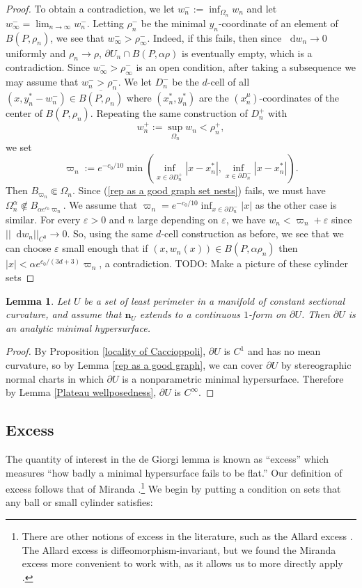 \documentclass[reqno,10pt]{amsart}
\newcommand*\dif{\mathop{}\!\mathrm{d}}
\newcommand{\normal}{\mathbf n}
\newtheorem{lemma}[theorem]{Lemma}
\theoremstyle{definition}
\numberwithin{equation}{section}
\begin{document}
\begin{proof}
To obtain a contradiction, we let $w_n^- := \inf_{\Omega_n} w_n$ and let $w_\infty^- = \lim_{n \to \infty} w_n^-$.
Letting $\rho^-_n$ be the minimal $y_n$-coordinate of an element of $B(P, \rho_n)$, we see that $w_\infty^- > \rho^-_\infty$.
Indeed, if this fails, then since $\dif w_n \to 0$ uniformly and $\rho_n \to \rho$, $\partial U_n \cap B(P, \alpha \rho)$ is eventually empty, which is a contradiction.
Since $w_\infty^- > \rho^-_\infty$ is an open condition, after taking a subsequence we may assume that $w_n^- > \rho_n^-$.
We let $D_n^-$ be the $d$-cell of all $(x, y_n^* - w_n^-) \in \overline{B(P, \rho_n)}$ where $(x_n^*, y_n^*)$ are the $(x^\mu_n)$-coordinates of the center of $B(P, \rho_n)$.
Repeating the same construction of $D_n^+$ with
$$w_n^+ := \sup_{\Omega_n} w_n < \rho_n^+,$$
we set
$$\varpi_n := e^{-c_0/10}\min\left(\inf_{x \in \partial D_n^+} |x - x_n^*|, \inf_{x \in \partial D_n^-} |x - x_n^*|\right).$$
Then $B_{\varpi_n} \Subset \Omega_n$.
Since (\ref{rep as a good graph set nests}) fails, we must have $\Omega^\alpha_n \not \Subset B_{\alpha e^{c_0} \varpi_n}$.
We assume that $\varpi_n = e^{-c_0/10} \inf_{x \in \partial D_n^-} |x|$ as the other case is similar.
For every $\varepsilon > 0$ and $n$ large depending on $\varepsilon$, we have $w_n < \varpi_n + \varepsilon$ since $||\dif w_n||_{C^0} \to 0$.
So, using the same $d$-cell construction as before, we see that we can choose $\varepsilon$ small enough that if $(x, w_n(x)) \in B(P, \alpha \rho_n)$ then $|x| < \alpha e^{c_0/(3d + 3)} \varpi_n$, a contradiction.
TODO: Make a picture of these cylinder sets
\end{proof}

\begin{lemma}\label{C1 implies smooth}
Let $U$ be a set of least perimeter in a manifold of constant sectional curvature, and assume that $\normal_U$ extends to a continuous $1$-form on $\partial U$.
Then $\partial U$ is an analytic minimal hypersurface.
\end{lemma}
\begin{proof}
By Proposition \ref{locality of Caccioppoli}, $\partial U$ is $C^1$ and has no mean curvature, so by Lemma \ref{rep as a good graph}, we can cover $\partial U$ by stereographic normal charts in which $\partial U$ is a nonparametric minimal hypersurface.
Therefore by Lemma \ref{Plateau wellposedness}, $\partial U$ is $C^\infty$.
\end{proof}

\subsection{Excess}
The quantity of interest in the de Giorgi lemma is known as ``excess'' which measures ``how badly a minimal hypersurface fails to be flat.''
Our definition of excess follows that of Miranda \cite{Miranda66}.\footnote{There are other notions of excess in the literature, such as the Allard excess \cite{Allard72}. The Allard excess is diffeomorphism-invariant, but we found the Miranda excess more convenient to work with, as it allows us to more directly apply \cite[Lemma 4.2]{Miranda66}.}
We begin by putting a condition on sets that any ball or small cylinder satisfies:
\end{document}
